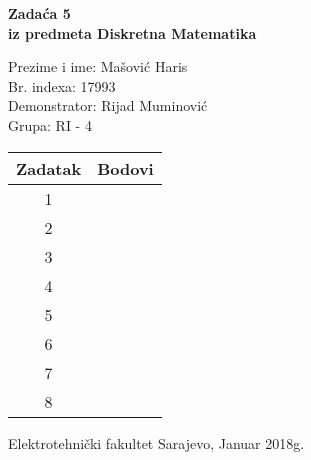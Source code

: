 \documentclass[12pt]{article}
\newcommand{\prezimeIme}{Mašović Haris}
\newcommand{\brIndexa}{17993}
\newcommand{\brZadace}{5}
\begin{document}
    
    \thispagestyle{empty}
    \begin{center}
      \vspace*{1cm}

      \vspace*{2cm}
      {\huge \bf Zadaća \brZadace } \\
      \vspace*{1cm}
      {\Large \bf iz predmeta Diskretna Matematika}

      \vspace*{1.25cm}

      {\Large Prezime i ime: \prezimeIme} \\
      \vspace*{0.5cm}
      {\Large Br. indexa: \brIndexa} \\
      \vspace*{0.5cm}
      {\Large Demonstrator: Rijad Muminović} \\
      \vspace*{0.5cm}
      {\Large Grupa: RI - 4} \\ 
      
      \vspace*{2cm}
      \renewcommand{\arraystretch}{1.75}
      \begin{tabular}{|c|c|}
    	\hline Zadatak & Bodovi \\
    	\hline 1 &  \\
    	\hline 2 &  \\
    	\hline 3 &  \\
    	\hline 4 &  \\
    	\hline 5 &  \\
    	\hline 6 &  \\
    	\hline 7 &  \\
    	\hline 8 &  \\
    	\hline
     \end{tabular}

      \vfill


      {\large Elektrotehnički fakultet Sarajevo, Januar 2018g.}

    \end{center}
    \newpage
    \thispagestyle{empty}
    
\end{document}
